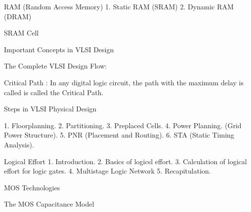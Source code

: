 				RAM (Random Access Memory)
1. Static RAM (SRAM)
2. Dynamic RAM (DRAM)

SRAM Cell


 









Important Concepts in VLSI Design

The Complete VLSI Design Flow:

















































Critical Path : In any digital logic circuit, the path with the maximum delay is called is called the Critical Path.

Steps in VLSI Physical Design

1. Floorplanning.
2. Partitioning.
3. Preplaced Cells.
4. Power Planning. (Grid Power Structure).
5. PNR (Placement and Routing).
6. STA (Static Timing Analysis).



									Logical Effort
1. Introduction.
2. Basics of logicsl effort.
3. Calculation of logical effort for logic gates.
4. Multistage Logic Network
5. Recapitulation. 







									MOS Technologies

The MOS Capacitance Model


















